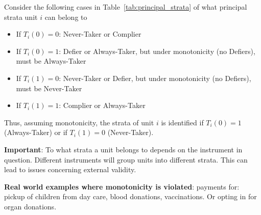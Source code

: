 \documentclass[11pt]{exam}
\theoremstyle{plain}
\begin{document}
Consider the following cases in Table~\ref{tab:principal_strata} of what principal strata unit $i$ can belong to
\begin{itemize}
    \item If $T_i(0) = 0$: Never-Taker or Complier
    \item If $T_i(0) = 1$: Defier or Always-Taker, but under monotonicity (no Defiers), must be Always-Taker
    \item If $T_i(1) = 0$: Never-Taker or Defier,  but under monotonicity (no Defiers), must be Never-Taker
    \item If $T_i(1) = 1$: Complier or Always-Taker
\end{itemize}
Thus, assuming monotonicity, the strata of unit $i$ is identified if $T_i(0) = 1$ (Always-Taker) or if $T_i(1) = 0$ (Never-Taker). 

\textbf{Important}: To what strata a unit belongs to depends on the instrument in question. Different instruments will group units into different strata. This can lead to issues concerning external validity.

\textbf{Real world examples where monotonicity is violated}: payments for: pickup of children from day care, blood donations, vaccinations. Or opting in for organ donations.
\end{document}
